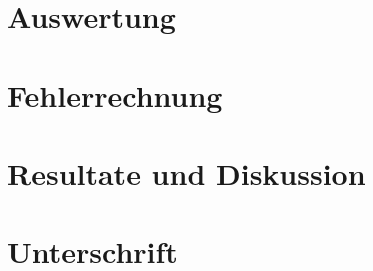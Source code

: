\documentclass{fhnwreport/fhnwreport}
\begin{document}
\clearpage
\section{Auswertung}
\label{sec:auswertung}



\clearpage
\section{Fehlerrechnung}
\label{sec:fehlerrechnung}



\clearpage
\section{Resultate und Diskussion}
\label{sec:results}



\clearpage
\section*{Unterschrift}
\label{sec:signature}



\clearpage
\begin{appendices}
    \label{sec:appendix}
    
\end{appendices}

\clearpage
{}
{}
{}
\end{document}
